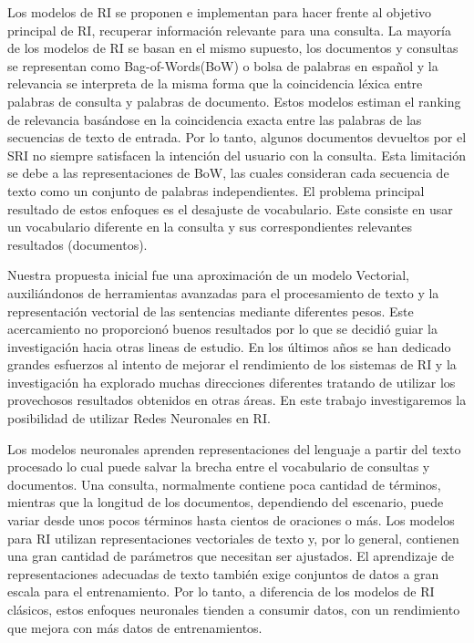 \documentclass{llncs}
\begin{document}
Los modelos de RI se proponen e implementan para hacer frente al objetivo principal de RI, recuperar información relevante para una consulta. La mayoría de los modelos de RI se basan en el mismo supuesto, los documentos y consultas se representan como Bag-of-Words(BoW) o bolsa de palabras en español y la relevancia se interpreta de la misma forma que la coincidencia léxica entre palabras de consulta y palabras de documento. Estos modelos estiman el ranking de relevancia basándose en la coincidencia exacta entre las palabras de las secuencias de texto de entrada. Por lo tanto, algunos documentos devueltos por el SRI no siempre satisfacen la intención del usuario con la consulta. Esta limitación se debe a las representaciones de BoW, las cuales consideran cada secuencia de texto como un conjunto de palabras independientes. El problema principal resultado de estos enfoques es el desajuste de vocabulario. Este consiste en usar un vocabulario diferente en la consulta y sus correspondientes relevantes resultados (documentos).

Nuestra propuesta inicial fue una aproximación de un modelo Vectorial, auxiliándonos de herramientas avanzadas para el procesamiento de texto y la representación vectorial de las sentencias mediante diferentes pesos. Este acercamiento no proporcionó buenos resultados por lo que se decidió guiar la investigación hacia otras lineas de estudio. En los últimos años se han dedicado grandes esfuerzos al intento de mejorar el rendimiento de los sistemas de RI y la investigación ha explorado muchas direcciones diferentes tratando de utilizar los provechosos resultados obtenidos en otras áreas. En este trabajo investigaremos la posibilidad de utilizar Redes Neuronales en RI. 

Los modelos neuronales aprenden representaciones del lenguaje a partir del texto procesado lo cual puede salvar la brecha entre el vocabulario de consultas y documentos. Una consulta, normalmente contiene poca cantidad de términos, mientras que la longitud de los documentos, dependiendo del escenario, puede variar desde unos pocos términos hasta cientos de oraciones o más. Los modelos para RI utilizan representaciones vectoriales de texto y, por lo general, contienen una gran cantidad de parámetros que necesitan ser ajustados. El aprendizaje de representaciones adecuadas de texto también exige conjuntos de datos a gran escala para el entrenamiento. Por lo tanto, a diferencia de los modelos de RI clásicos, estos enfoques neuronales tienden a consumir datos, con un rendimiento que mejora con más datos de entrenamientos.
\end{document}
